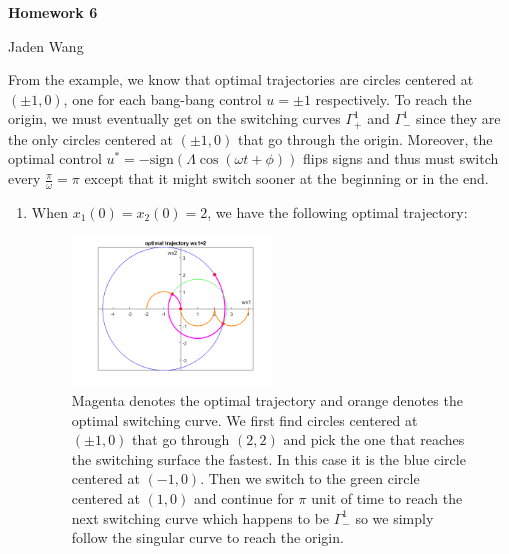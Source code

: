 \documentclass[12pt]{article}
\begin{document}
\centerline {\textsf{\textbf{\LARGE{Homework 6}}}}
\centerline {Jaden Wang}
\vspace{.15in}
\begin{problem}[1]
From the example, we know that optimal trajectories are circles centered at $ (\pm 1,0)$, one for each bang-bang control $ u = \pm 1$ respectively. To reach the origin, we must eventually get on the switching curves $ \Gamma_+^{1} $ and $ \Gamma_{-}^{1}$ since they are the only circles centered at $ (\pm1,0)$ that go through the origin. Moreover, the optimal control $ u^*  = - \text{sign}(\Lambda \cos(\omega t + \phi))$ flips signs and thus must switch every  $ \frac{\pi}{ \omega} = \pi$ except that it might switch sooner at the beginning or in the end. 

\begin{enumerate}[label=(\alph*)]
\item When $ x_1(0) = x_2(0)=2$, we have the following optimal trajectory:
~\begin{figure}[H]
	\centering
	\includegraphics[width=0.5\textwidth]{./figures/6.1.png}
\caption{Magenta denotes the optimal trajectory and orange denotes the optimal switching curve. We first find circles centered at $ (\pm 1,0)$ that go through $ (2,2)$ and pick the one that reaches the switching surface the fastest. In this case it is the blue circle centered at  $ (-1,0)$. Then we switch to the green circle centered at $ (1,0)$ and continue for $ \pi$ unit of time to reach the next switching curve which happens to be $ \Gamma_{-}^{1}$ so we simply follow the singular curve to reach the origin.}
\end{figure}


\end{enumerate}
\end{problem}
\end{document}
